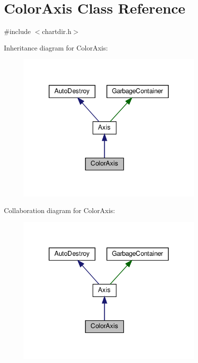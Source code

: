 \hypertarget{class_color_axis}{}\section{Color\+Axis Class Reference}
\label{class_color_axis}


{\ttfamily \#include $<$chartdir.\+h$>$}



Inheritance diagram for Color\+Axis\+:
\nopagebreak
\begin{figure}[H]
\begin{center}
\leavevmode
\includegraphics[width=264pt]{class_color_axis__inherit__graph}
\end{center}
\end{figure}


Collaboration diagram for Color\+Axis\+:
\nopagebreak
\begin{figure}[H]
\begin{center}
\leavevmode
\includegraphics[width=264pt]{class_color_axis__coll__graph}
\end{center}
\end{figure}
